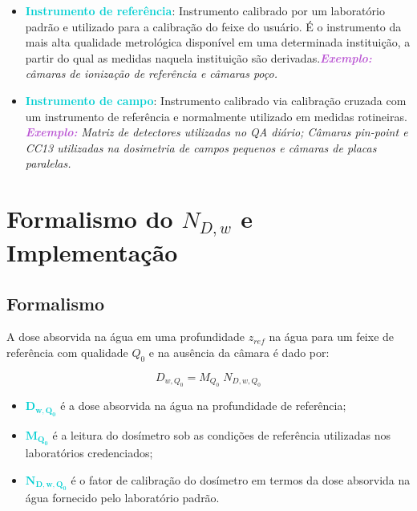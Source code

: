 \documentclass[11pt,a4paper]{article}
\newcounter{exemplo}
\begin{document}
\begin{itemize}
			\item \textcolor{DarkTurquoise}{\textbf{Instrumento de referência}}: Instrumento calibrado por um laboratório padrão e utilizado para a calibração do feixe do usuário. É o instrumento da mais alta qualidade metrológica disponível em uma determinada instituição, a partir do qual as medidas naquela instituição são derivadas.\textcolor{MediumOrchid}{\textit{\textbf{Exemplo:}}} \textit{câmaras de ionização de referência e câmaras poço.}
			
			\item \textcolor{DarkTurquoise}{\textbf{Instrumento de campo}}: Instrumento calibrado via calibração cruzada com um instrumento de referência e normalmente utilizado em medidas rotineiras. \textcolor{MediumOrchid}{\textit{\textbf{Exemplo:}}} \textit{Matriz de detectores utilizadas no QA diário; Câmaras pin-point e CC13 utilizadas na dosimetria de campos pequenos e câmaras de placas paralelas.}
		\end{itemize}

	\section{Formalismo do $N_{D,w}$ e Implementação}

	\subsection*{Formalismo}

	A dose absorvida na água em uma profundidade $z_{ref}$ na água para um feixe de referência com qualidade $Q_0$ e na ausência da câmara é dado por:

  		\begin{equation}
			D_{w,Q_0} = M_{Q_0} \; N_{D,w,Q_{0}}
		\end{equation}
  		

  		\begin{exemplo}[onde:]
			\begin{itemize}[label=\textcolor{CarnationPink}{$\star$}]
				\item \textbf{\textcolor{DarkTurquoise}{$\mathbf{D_{w,Q_0}}$}} é a dose absorvida na água na profundidade de referência;
				\item \textbf{\textcolor{DarkTurquoise}{$\mathbf{M_{Q_0}}$}} é a leitura do dosímetro sob as condições de referência utilizadas nos laboratórios credenciados;
				\item \textbf{\textcolor{DarkTurquoise}{$\mathbf{N_{D,w,Q_{0}}}$}} é o fator de calibração  do dosímetro em termos da dose absorvida na água fornecido pelo laboratório padrão.
			\end{itemize}
		\end{exemplo}
\end{document}
